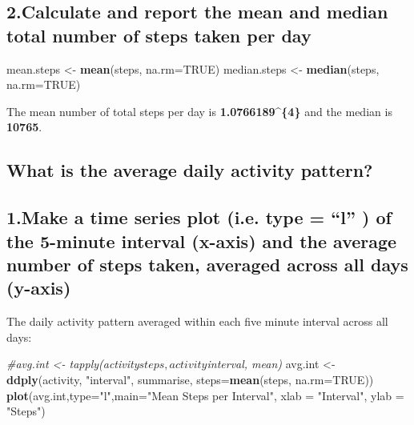 \documentclass[]{article}
\newenvironment{Shaded}{\begin{snugshade}}{\end{snugshade}}
\newcommand{\KeywordTok}[1]{\textcolor[rgb]{0.13,0.29,0.53}{\textbf{{#1}}}}
\newcommand{\DataTypeTok}[1]{\textcolor[rgb]{0.13,0.29,0.53}{{#1}}}
\newcommand{\StringTok}[1]{\textcolor[rgb]{0.31,0.60,0.02}{{#1}}}
\newcommand{\CommentTok}[1]{\textcolor[rgb]{0.56,0.35,0.01}{\textit{{#1}}}}
\newcommand{\OtherTok}[1]{\textcolor[rgb]{0.56,0.35,0.01}{{#1}}}
\newcommand{\NormalTok}[1]{{#1}}
\begin{document}
\subsection{2.Calculate and report the mean and median total number of
steps taken per
day}\label{calculate-and-report-the-mean-and-median-total-number-of-steps-taken-per-day}

\begin{Shaded}
\begin{Highlighting}[]
\NormalTok{mean.steps <-}\StringTok{ }\KeywordTok{mean}\NormalTok{(steps, }\DataTypeTok{na.rm=}\OtherTok{TRUE}\NormalTok{)}
\NormalTok{median.steps <-}\StringTok{ }\KeywordTok{median}\NormalTok{(steps, }\DataTypeTok{na.rm=}\OtherTok{TRUE}\NormalTok{)}
\end{Highlighting}
\end{Shaded}

The mean number of total steps per day is
\textbf{1.0766189\^{}\{4\}} and the median is \textbf{10765}.

\subsection{What is the average daily activity
pattern?}\label{what-is-the-average-daily-activity-pattern-1}

\subsection{1.Make a time series plot (i.e. type = ``l'' ) of the
5-minute interval (x-axis) and the average number of steps taken,
averaged across all days
(y-axis)}\label{make-a-time-series-plot-i.e.-type-l-of-the-5-minute-interval-x-axis-and-the-average-number-of-steps-taken-averaged-across-all-days-y-axis}

The daily activity pattern averaged within each five minute interval
across all days:

\begin{Shaded}
\begin{Highlighting}[]
\CommentTok{#avg.int <- tapply(activity$steps, activity$interval, mean)}
\NormalTok{avg.int <-}\StringTok{ }\KeywordTok{ddply}\NormalTok{(activity, }\StringTok{"interval"}\NormalTok{, summarise,}
                        \DataTypeTok{steps=}\KeywordTok{mean}\NormalTok{(steps, }\DataTypeTok{na.rm=}\OtherTok{TRUE}\NormalTok{))}
\KeywordTok{plot}\NormalTok{(avg.int,}\DataTypeTok{type=}\StringTok{"l"}\NormalTok{,}\DataTypeTok{main=}\StringTok{"Mean Steps per Interval"}\NormalTok{, }\DataTypeTok{xlab =} \StringTok{"Interval"}\NormalTok{, }\DataTypeTok{ylab =} \StringTok{"Steps"}\NormalTok{)}
\end{Highlighting}
\end{Shaded}
\end{document}
